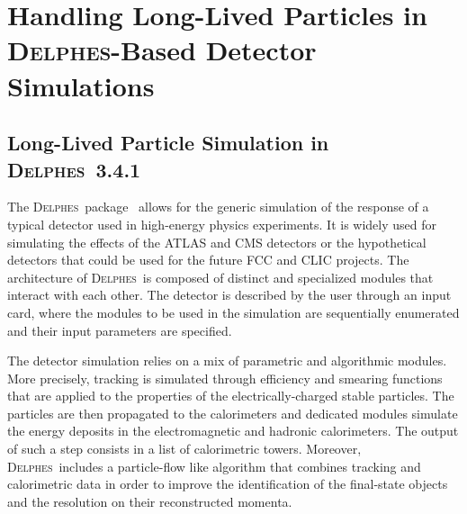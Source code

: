 
\newcommand{\MG}{\textsc{MadGraph}~5\_aMC@NLO}
\newcommand{\PY}{\textsc{Pythia}~8}
\newcommand{\MA}{\textsc{MadAnalysis}~5}
\newcommand{\MW}{\textsc{MadWidth}}
\newcommand{\MAnorm}{{MadAnalysis}~5}
\newcommand{\FJ}{\textsc{FastJet}}
\newcommand{\DEL}{\textsc{Delphes}}
\newcommand{\ROOT}{\textsc{Root}}




\section{Handling Long-Lived Particles in \DEL-Based Detector Simulations}
\label{sec:ch5-recastingDelphes}

\subsection{Long-Lived Particle Simulation in \DEL~3.4.1}

The \DEL\ package~\cite{deFavereau:2013fsa} allows for the generic simulation of
the response of a typical detector used in high-energy physics experiments. It
is widely used for simulating the effects of the ATLAS and CMS detectors or the
hypothetical detectors that could be used for the future FCC and CLIC projects.
The architecture of \DEL\ is composed of distinct
and specialized modules that interact with each other. The detector is described
by the user through an input card, where the modules to be used in the
simulation are sequentially enumerated and their input parameters are specified.

The detector simulation relies on a mix of parametric and algorithmic
modules. More precisely, tracking is simulated through efficiency and smearing
functions that are applied to the properties of the electrically-charged stable
particles. The particles are then propagated to the calorimeters and dedicated
modules simulate the energy deposits in the electromagnetic and hadronic
calorimeters. The output of such a step consists in a list of calorimetric towers.
Moreover, \DEL\ includes a particle-flow like
algorithm that combines tracking and calorimetric data in order to
improve the identification of the final-state objects and the resolution on
their reconstructed momenta.

